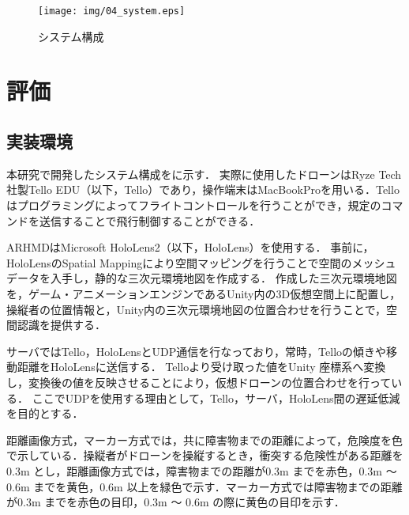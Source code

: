 \documentclass[submit, sigrecommended]{ipsj}
\begin{document}

\begin{figure}[tb]
  \centering
  \texttt{[image: img/04\_system.eps]}
  \caption{システム構成}
  \label{fig:04_system}
\end{figure}
  

\section{評価}

\subsection{実装環境}
本研究で開発したシステム構成をに示す．
実際に使用したドローンはRyze Tech社製Tello EDU（以下，Tello）であり，操作端末はMacBookProを用いる．Telloはプログラミングによってフライトコントロールを行うことができ，規定のコマンドを送信することで飛行制御することができる．
\par
ARHMDはMicrosoft HoloLens2（以下，HoloLens）を使用する．
事前に，HoloLensのSpatial Mappingにより空間マッピングを行うことで空間のメッシュデータを入手し，静的な三次元環境地図を作成する．
作成した三次元環境地図を，ゲーム・アニメーションエンジンであるUnity内の3D仮想空間上に配置し，操縦者の位置情報と，Unity内の三次元環境地図の位置合わせを行うことで，空間認識を提供する．
\par
サーバではTello，HoloLensとUDP通信\cite{web-udp}を行なっており，常時，Telloの傾きや移動距離をHoloLensに送信する．
Telloより受け取った値をUnity 座標系へ変換し，変換後の値を反映させることにより，仮想ドローンの位置合わせを行っている．
ここでUDPを使用する理由として，Tello，サーバ，HoloLens間の遅延低減を目的とする．
\par
距離画像方式，マーカー方式では，共に障害物までの距離によって，危険度を色で示している．操縦者がドローンを操縦するとき，衝突する危険性がある距離を0.3m とし\cite{tech-01}，距離画像方式では，障害物までの距離が0.3m までを赤色，0.3m 〜 0.6m までを黄色，0.6m 以上を緑色で示す．マーカー方式では障害物までの距離が0.3m までを赤色の目印，0.3m 〜 0.6m の際に黄色の目印を示す．
\end{document}
